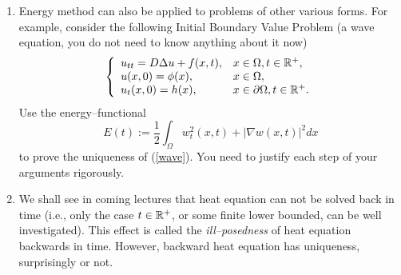 \documentclass[6pt]{article}
\numberwithin{equation}{section}
\def\mathbb{\Bbb}
\begin{document}
\begin{enumerate}
(i).  Use energy method to prove uniqueness to the following problem
\begin{equation}\label{decay}
\left\{
\begin{array}{ll}
u_t=D\Delta u-u,&x\in \Omega,t>0,\\
u(x,0)=\phi(x),&x\in \Omega,\\
u(x,t)=\gamma,&x \in \partial \Omega, t>0.
\end{array}
\right.
\end{equation}

(ii).  Do the same for the following problem with $f=f(u)$ dependent only on $u$
\begin{equation}\label{nonlinear}
\left\{
\begin{array}{ll}
u_t=D\Delta u+f(u),&x\in \Omega,t>0,\\
u(x,0)=\phi(x),&x\in \Omega,\\
u(x,t)=\gamma,&x \in \partial \Omega, t>0.
\end{array}
\right.
\end{equation}
For what conditions (on $f$) do you have uniqueness of (\ref{nonlinear})?  Hint: according to intermediate value theorem, $f(u_1)-f(u_2)=f'(u_1+\theta (u_2-u_1))(u_1-u_2)$ for some $\theta\in[0,1]$.  Remark: you should see that it also works even if $f=f(x,t,u)$, while I skip $x$ and $t$ with loss of generality.

\vspace{0.2in}\item  Energy method can also be applied to problems of other various forms.  For example, consider the following Initial Boundary Value Problem (a wave equation, you do not need to know anything about it now)
\begin{equation}\label{wave}
\left\{
\begin{array}{ll}
u_{tt}=D\Delta u+f(x,t),&x\in \Omega,t\in\mathbb R^+,\\
u(x,0)=\phi(x),&x\in \Omega,\\
u_t(x,0)=h(x),&x \in \partial \Omega, t\in\mathbb R^+.
\end{array}
\right.
\end{equation}
Use the energy--functional
\[E(t):=\frac{1}{2}\int_\Omega w_t^2(x,t)+|\nabla w(x,t)|^2 dx\]
to prove the uniqueness of (\ref{wave}).  You need to justify each step of your arguments rigorously.

\item  We shall see in coming lectures that heat equation can not be solved back in time (i.e., only the case $t\in\mathbb R^+$, or some finite lower bounded, can be well investigated).  This effect is called the \emph{ill--posedness} of heat equation backwards in time.  However, backward heat equation has uniqueness, surprisingly or not.


\end{enumerate}
\end{document}

